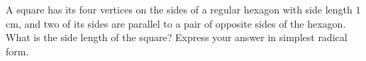 A square has its four vertices on the sides of a regular hexagon with side length $1$ cm, and two of its sides are parallel to a pair of opposite sides of the hexagon. What is the side length of the square? Express your answer in simplest radical form.
